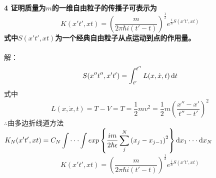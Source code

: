 \documentclass[12pt]{article}
\numberwithin{equation}{section}	 %
\begin{document}
\begin{spacing}{1.5}
~\\
\textbf{4 \quad 证明质量为$m$的一维自由粒子的传播子可表示为
\begin{equation}\nonumber 		%
K(x't',xt) = \left(\frac{m}{2\pi\hbar i(t'-t)}\right)^{\frac{1}{2}} e^{\frac{i}{\hbar}S(x't',xt)}
\end{equation}
式中$S(x't',xt)$为一个经典自由粒子从点运动到点的作用量。}\\
\\
解：
\begin{equation}
S(x''t'',x't') = \int^{t''}_{t'} L(x,\dot{x},t) \mathop{}\!\mathrm{d} t
\end{equation}
式中
\begin{equation}
L(x,\dot{x},t) = T - V = T = \frac{1}{2}mv^{2} = \frac{1}{2}m\left(\frac{x''-x'}{t''-t'}\right)^{2}
\end{equation}
$\therefore$由多边折线道方法$\displaystyle K_{N}(x't',xt) = C_{N}\int \cdot\cdot\cdot \int exp\left\{\frac{im}{2\hbar\epsilon}\sum_{j}^{N}\left(x_{j}-x_{j-1}\right)^{2}\right\} \mathop{}\!\mathrm{d} x_{1} \cdot\cdot\cdot \mathop{}\!\mathrm{d} x_{N}$
\begin{equation}\nonumber 		%
K(x't',xt) = \left(\frac{m}{2\pi\hbar i(t'-t)}\right)^{\frac{1}{2}} e^{\frac{i}{\hbar}S(x't',xt)}
\end{equation}

\newpage

\end{spacing}
\end{document}
